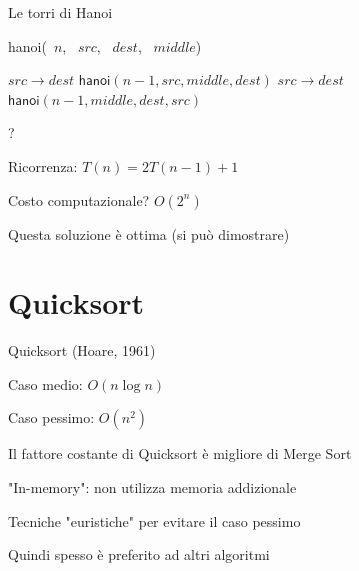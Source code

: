 \begin{frame}{Le torri di Hanoi}
\vspace{-12pt}
\begin{Procedure}
\caption[A]{\textsf{hanoi}(\INTEGER\ $n$, \INTEGER\ $\mathit{src}$, \INTEGER\ $\mathit{dest}$, \INTEGER\ $\mathit{middle}$)}

{
  \PRINT $\mathit{src} \rightarrow \mathit{dest}$\;
}
{
  $\textsf{hanoi}(n-1, \mathit{src}, \mathit{middle}, \mathit{dest})$\;
  \PRINT $\mathit{src} \rightarrow \mathit{dest}$\;
 	$\textsf{hanoi}(n-1, \mathit{middle}, \mathit{dest}, \mathit{src})$\;
}
\end{Procedure}

\vspace{-6pt}
\begin{myboxtitle}
\begin{overprint}
?
\BIL
\item Ricorrenza: $T(n) = 2T(n-1)+1$
\item Costo computazionale? \alert{$O(2^n)$}
\item Questa soluzione è ottima (si può dimostrare)
\EIL
\end{overprint}
\end{myboxtitle}
\end{frame}

\section{Quicksort}

\begin{frame}{Quicksort (Hoare, 1961)}
	
\vspace{-9pt}
\begin{myboxtitle}
\BI
\item Caso medio: $O(n \log n)$
\item Caso pessimo: $O(n^2)$
\EI
\end{myboxtitle}

\begin{myboxtitle}
\BI
\item Il fattore costante di Quicksort è migliore di Merge Sort
\item "In-memory": non utilizza memoria addizionale
\item Tecniche "euristiche" per evitare il caso pessimo
\item Quindi spesso è preferito ad altri algoritmi
\EI
\end{myboxtitle}

\end{frame}


